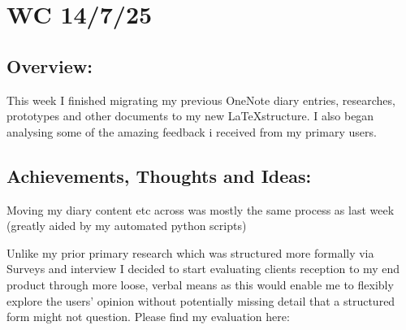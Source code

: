 \section{WC 14/7/25}
\subsection*{Overview:}
This week I finished migrating my previous OneNote diary entries, researches, prototypes and other documents to my new \LaTeX structure. I also began analysing some of the amazing feedback i received from my primary users.

\subsection*{Achievements, Thoughts and Ideas:}
Moving my diary content etc across was mostly the same process as last week (greatly aided by my automated python scripts)

Unlike my prior primary research which was structured more formally via Surveys and interview I decided to start evaluating clients reception to my end product through more loose, verbal means as this would enable me to flexibly explore the users' opinion without potentially missing detail that a structured form might not question. Please find my evaluation here: 